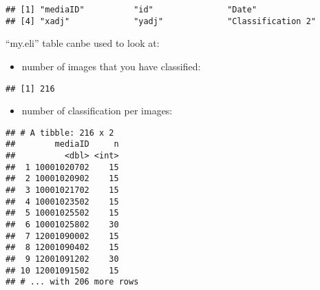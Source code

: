 \documentclass[]{article}
\newenvironment{Shaded}{\begin{snugshade}}{\end{snugshade}}
\newcommand{\KeywordTok}[1]{\textcolor[rgb]{0.13,0.29,0.53}{\textbf{#1}}}
\newcommand{\OperatorTok}[1]{\textcolor[rgb]{0.81,0.36,0.00}{\textbf{#1}}}
\newcommand{\NormalTok}[1]{#1}
\providecommand{\tightlist}{%
  \setlength{\itemsep}{0pt}\setlength{\parskip}{0pt}}
\begin{document}
\begin{verbatim}
## [1] "mediaID"          "id"               "Date"            
## [4] "xadj"             "yadj"             "Classification 2"
\end{verbatim}

\begin{Shaded}
\end{Shaded}

``my.eli'' table canbe used to look at:

\begin{itemize}
\tightlist
\item
  number of images that you have classified:
\end{itemize}

\begin{Shaded}
\end{Shaded}

\begin{verbatim}
## [1] 216
\end{verbatim}

\begin{itemize}
\tightlist
\item
  number of classification per images:
\end{itemize}

\begin{Shaded}
\end{Shaded}

\begin{verbatim}
## # A tibble: 216 x 2
##        mediaID     n
##          <dbl> <int>
##  1 10001020702    15
##  2 10001020902    15
##  3 10001021702    15
##  4 10001023502    15
##  5 10001025502    15
##  6 10001025802    30
##  7 12001090002    15
##  8 12001090402    15
##  9 12001091202    30
## 10 12001091502    15
## # ... with 206 more rows
\end{verbatim}
\end{document}

